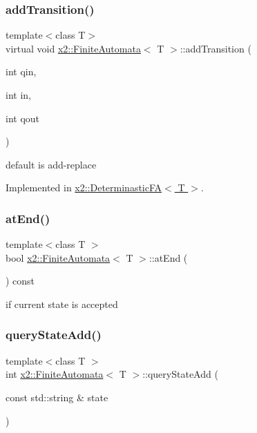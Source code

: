 \subsubsection{\texorpdfstring{add\+Transition()}{addTransition()}}
{\footnotesize\ttfamily template$<$class T$>$ \\
virtual void \hyperlink{classx2_1_1_finite_automata}{x2\+::\+Finite\+Automata}$<$ T $>$\+::add\+Transition (\begin{DoxyParamCaption}\item[{int}]{qin,  }\item[{int}]{in,  }\item[{int}]{qout }\end{DoxyParamCaption})\hspace{0.3cm}{\ttfamily [pure virtual]}}

default is add-\/replace 

Implemented in \hyperlink{classx2_1_1_determinastic_f_a_adbd0f99ea29d31abd9f9675ee5b9fdef}{x2\+::\+Determinastic\+F\+A$<$ T $>$}.

\mbox{\label{classx2_1_1_finite_automata_a993fb22633638494c8a267cd2c5329fc}} 
\subsubsection{\texorpdfstring{at\+End()}{atEnd()}}
{\footnotesize\ttfamily template$<$class T $>$ \\
bool \hyperlink{classx2_1_1_finite_automata}{x2\+::\+Finite\+Automata}$<$ T $>$\+::at\+End (\begin{DoxyParamCaption}{ }\end{DoxyParamCaption}) const\hspace{0.3cm}{\ttfamily [inline]}}

if current state is accepted \mbox{\label{classx2_1_1_finite_automata_a44ca86f1589eeaa77ab73f953033c5a5}} 
\subsubsection{\texorpdfstring{query\+State\+Add()}{queryStateAdd()}}
{\footnotesize\ttfamily template$<$class T $>$ \\
int \hyperlink{classx2_1_1_finite_automata}{x2\+::\+Finite\+Automata}$<$ T $>$\+::query\+State\+Add (\begin{DoxyParamCaption}\item[{const std\+::string \&}]{state }\end{DoxyParamCaption})\hspace{0.3cm}{\ttfamily [inline]}}

